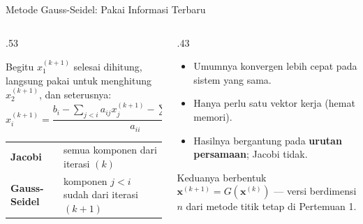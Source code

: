 \documentclass[aspectratio=169,10pt]{beamer}
\begin{document}
\begin{frame}{Metode Gauss-Seidel: Pakai Informasi Terbaru}
\scriptsize
\begin{columns}[T,totalwidth=\textwidth]
\begin{column}{.53\textwidth}
\begin{bluebox}
Begitu $x_1^{(k+1)}$ selesai dihitung, langsung pakai untuk menghitung $x_2^{(k+1)}$, dan seterusnya:
\[
x_i^{(k+1)}=\frac{b_i-\sum_{j<i}a_{ij}x_j^{(k+1)}-\sum_{j>i}a_{ij}x_j^{(k)}}{a_{ii}}.
\]
\end{bluebox}
\begin{orangebox}
\begin{tabularx}{\linewidth}{>{\bfseries}p{.24\linewidth} X}
\toprule
Jacobi & semua komponen dari iterasi $(k)$ \\
Gauss-Seidel & komponen $j<i$ sudah dari iterasi $(k+1)$\\
\bottomrule
\end{tabularx}
\end{orangebox}
\end{column}
\begin{column}{.43\textwidth}
\begin{greenbox}
\begin{itemize}\setlength\itemsep{2pt}
\item Umumnya konvergen lebih cepat pada sistem yang sama.
\item Hanya perlu satu vektor kerja (hemat memori).
\item Hasilnya bergantung pada \textbf{urutan persamaan}; Jacobi tidak.
\end{itemize}
\end{greenbox}
\begin{goldbox}
Keduanya berbentuk $\mathbf{x}^{(k+1)}=G(\mathbf{x}^{(k)})$ --- versi berdimensi $n$ dari metode titik tetap di Pertemuan 1.
\end{goldbox}
\end{column}
\end{columns}
\end{frame}
\end{document}
